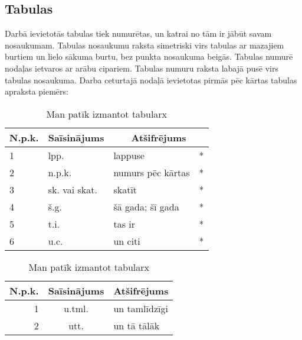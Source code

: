 \subsection{Tabulas}
\hspace*{5mm} Darbā ievietotās tabulas tiek numurētas, un katrai no tām ir jābūt savam
nosaukumam. Tabulas nosaukumu raksta simetriski virs tabulas ar mazajiem burtiem
un lielo sākuma burtu, bez punkta nosaukuma beigās. Tabulas numurē nodaļas
ietvaros ar arābu cipariem. Tabulas numuru raksta labajā pusē virs tabulas
nosaukuma. Darba ceturtajā nodaļā ievietotas pirmās pēc kārtas tabulas apraksta
piemērs:\\
%
	\begin{table}[!th]
	\begin{center}
		 \begin{tabularx}{\textwidth}{|m{1.5cm}|m{4.8cm}|X|X|}
		  \hline 
		  \textbf{N.p.k.} & \textbf{Saīsinājums} &  \multicolumn{2}{c|}{\textbf{Atšifrējums}} \\ 
		  \hline 
		  \hline 
		 1 & lpp. &  lappuse  & * \\ 
		  \hline 
		  2   & n.p.k. &  numurs pēc kārtas  & * \\ 
		  \hline 
		  3 & sk. vai skat. &  skatīt  & * \\ 
		  \hline 
		  4 & š.g. &  šā gada; šī gada  & * \\ 
		  \hline 
		  5 & t.i. &  tas ir & *  \\ 
		  \hline 
		  6 & u.c. &  un citi & *  \\ 
		  \hline 
		  \end{tabularx}  
		\caption{Man patīk izmantot tabularx}\label{tab:piemers1}
	\end{center}
	\end{table}
%
	\begin{table}[!th]
	\begin{center}
		 \begin{tabularx}{\textwidth}{|r|c|X|}
		  \hline 
		  \textbf{N.p.k.} & \textbf{Saīsinājums} & 	  \textbf{Atšifrējums} \\ 
		  \hline 
		  \hline 
		 1 & u.tml. &  un tamlīdzīgi   \\ 
		  \hline 
		  2   & utt. &  un tā tālāk  \\ 
		  \hline 
		  \end{tabularx}  
		\caption{Man patīk izmantot tabularx}\label{tab:piemers2}
	\end{center}
	\end{table}

